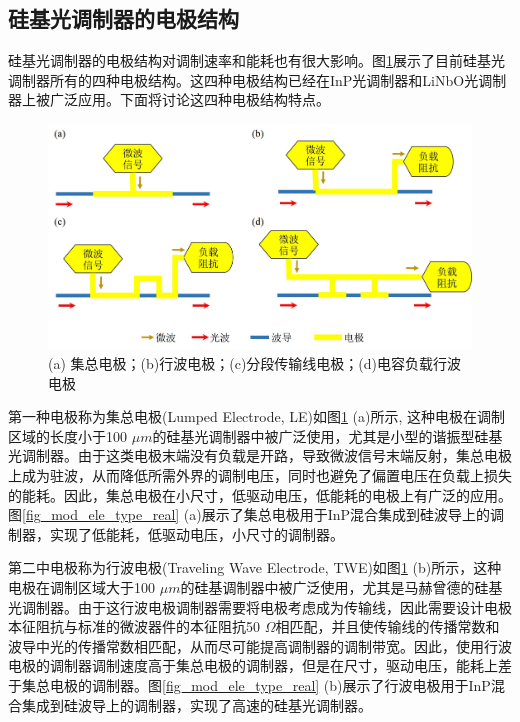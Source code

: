 \subsection{硅基光调制器的电极结构} \label{electrostructure}
硅基光调制器的电极结构对调制速率和能耗也有很大影响。图\ref{fig_mod_ele_type}展示了目前硅基光调制器所有的四种电极结构。这四种电极结构已经在InP光调制器和LiNbO光调制器上被广泛应用。下面将讨论这四种电极结构特点。

\begin{figure}[htb]
	\centering
	\includegraphics[width=12cm]{./Pictures/fig_mod_ele_type.jpg}
	\caption{ (a) 集总电极；(b)行波电极；(c)分段传输线电极；(d)电容负载行波电极}
	\label{fig_mod_ele_type}
\end{figure}

第一种电极称为集总电极(Lumped Electrode, LE)如图\ref{fig_mod_ele_type} (a)所示, 这种电极在调制区域的长度小于100 $\mu m$的硅基光调制器中被广泛使用，尤其是小型的谐振型硅基光调制器。由于这类电极末端没有负载是开路，导致微波信号末端反射，集总电极上成为驻波，从而降低所需外界的调制电压，同时也避免了偏置电压在负载上损失的能耗。因此，集总电极在小尺寸，低驱动电压，低能耗的电极上有广泛的应用。图\ref{fig_mod_ele_type_real} (a)展示了集总电极用于InP混合集成到硅波导上的调制器\cite{tang2012energy}，实现了低能耗，低驱动电压，小尺寸的调制器。

第二中电极称为行波电极(Traveling Wave Electrode, TWE)如图\ref{fig_mod_ele_type} (b)所示，这种电极在调制区域大于100 $\mu m$的硅基调制器中被广泛使用，尤其是马赫曾德的硅基光调制器。由于这行波电极调制器需要将电极考虑成为传输线，因此需要设计电极本征阻抗与标准的微波器件的本征阻抗50 $\Omega$相匹配，并且使传输线的传播常数和波导中光的传播常数相匹配，从而尽可能提高调制器的调制带宽。因此，使用行波电极的调制器调制速度高于集总电极的调制器，但是在尺寸，驱动电压，能耗上差于集总电极的调制器。图\ref{fig_mod_ele_type_real} (b)展示了行波电极用于InP混合集成到硅波导上的调制器\cite{tang2012energy}，实现了高速的硅基光调制器。

